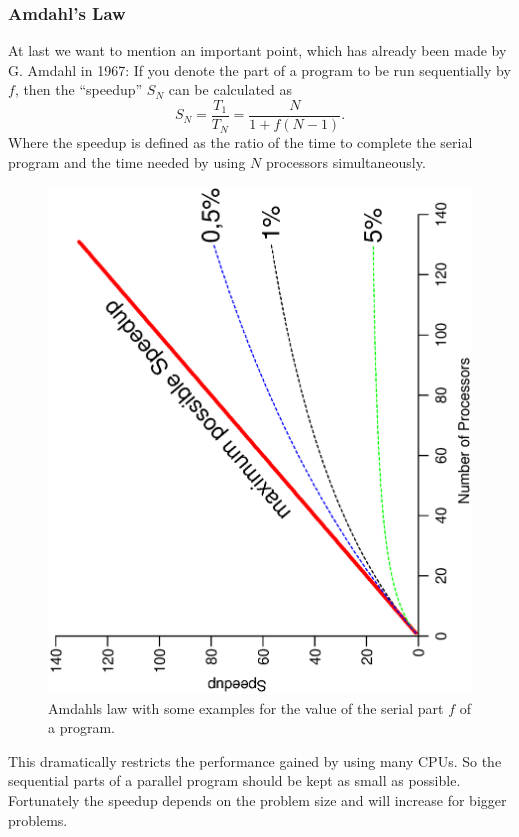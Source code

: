 \subsubsection{Amdahl's Law}
At last we want to mention an important point, which has already been made 
by G. Amdahl in 1967: If you denote the part of a program to be run
sequentially by $f$, then the ``speedup'' $S_N$ can be calculated as
$$ S_N =\frac{T_1}{T_N} = \frac{N}{1+f(N-1)} .$$
Where the speedup is defined as the ratio of the time to complete 
the serial program and the time needed by using $N$ processors simultaneously. 
\begin{figure}[htbp]
  \begin{center}
    \includegraphics[angle=-90,width=\textwidth]{Figures/Amdahl.eps}
    \caption{Amdahls law with some examples for the value of the serial
      part $f$ of a program.}
    \label{fig:Amdahl}
  \end{center}
\end{figure}
This dramatically restricts the performance gained by using many CPUs.
So the sequential parts of a parallel program should be kept as small
as possible. Fortunately the speedup depends on the problem size and
will increase for bigger problems. 

